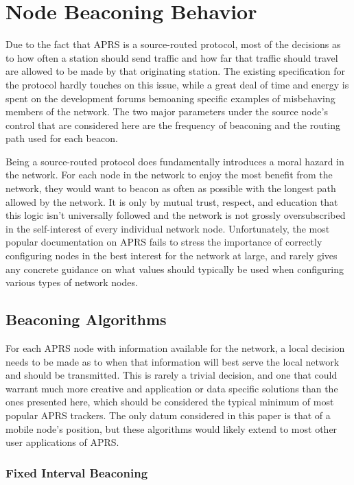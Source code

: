 \chapter{Node Beaconing Behavior}

Due to the fact that APRS is a source-routed protocol, most of the decisions as
to how often a station should send traffic and how far that traffic should
travel are allowed to be made by that originating station. 
The existing specification for the protocol hardly touches on this issue, 
while a great deal of time and energy is spent on the development forums 
bemoaning specific examples of misbehaving members of the network.
The two major parameters under the source node's control that are considered
here are the frequency of beaconing and the routing path used for each beacon.

Being a source-routed protocol does fundamentally introduces a
moral hazard in the network. For each node in the network to enjoy the
most benefit from the network, they would want to beacon as often as possible 
with the longest path allowed by the network.
It is only by mutual trust, respect, and education that this 
logic isn't universally followed and the network is not grossly oversubscribed
in the self-interest of every individual network node. 
Unfortunately, the most popular documentation on APRS fails to stress the 
importance of correctly configuring nodes in the best interest for the network
at large, and rarely gives any concrete guidance on what values should typically
be used when configuring various types of network nodes.


\section{Beaconing Algorithms}

For each APRS node with information available for the network,
a local decision needs to be made as to when that information will best 
serve the local network and should be transmitted. This is rarely a trivial 
decision, and one that could warrant much more creative and application or data
specific solutions than the ones presented here, which should be considered 
the typical minimum of most popular APRS trackers. The only datum considered 
in this paper is that of a mobile node's position, but these algorithms would
likely extend to most other user applications of APRS.

\subsection{Fixed Interval Beaconing}

